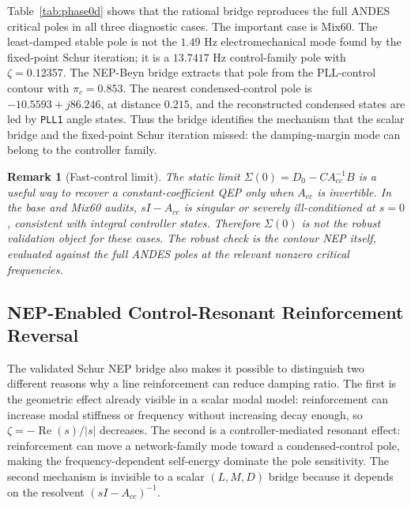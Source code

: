 \documentclass[journal]{IEEEtran}
\newtheorem{remark}{Remark}
\newcommand{\Real}{\operatorname{Re}}
\begin{document}
Table~\ref{tab:phase0d} shows that the rational bridge reproduces the full ANDES critical poles in all three diagnostic cases. The important case is Mix60. The least-damped stable pole is not the $1.49$ Hz electromechanical mode found by the fixed-point Schur iteration; it is a $13.7417$ Hz control-family pole with $\zeta=0.12357$. The NEP-Beyn bridge extracts that pole from the PLL-control contour with $\pi_c=0.853$. The nearest condensed-control pole is $-10.5593+j86.246$, at distance $0.215$, and the reconstructed condensed states are led by \texttt{PLL1} angle states. Thus the bridge identifies the mechanism that the scalar bridge and the fixed-point Schur iteration missed: the damping-margin mode can belong to the controller family.

\begin{remark}[Fast-control limit]
The static limit $\Sigma(0)=D_0-CA_{cc}^{-1}B$ is a useful way to recover a constant-coefficient QEP only when $A_{cc}$ is invertible. In the base and Mix60 audits, $sI-A_{cc}$ is singular or severely ill-conditioned at $s=0$, consistent with integral controller states. Therefore $\Sigma(0)$ is not the robust validation object for these cases. The robust check is the contour NEP itself, evaluated against the full ANDES poles at the relevant nonzero critical frequencies.
\end{remark}

\subsection{NEP-Enabled Control-Resonant Reinforcement Reversal}

The validated Schur NEP bridge also makes it possible to distinguish two different reasons why a line reinforcement can reduce damping ratio. The first is the geometric effect already visible in a scalar modal model: reinforcement can increase modal stiffness or frequency without increasing decay enough, so $\zeta=-\Real(s)/|s|$ decreases. The second is a controller-mediated resonant effect: reinforcement can move a network-family mode toward a condensed-control pole, making the frequency-dependent self-energy dominate the pole sensitivity. The second mechanism is invisible to a scalar $(L,M,D)$ bridge because it depends on the resolvent $(sI-A_{cc})^{-1}$.
\end{document}
